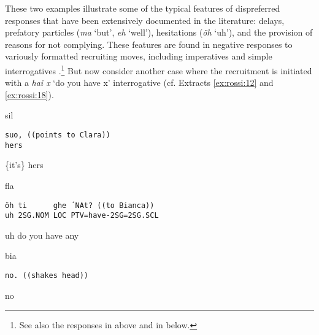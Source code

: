 \documentclass[output=paper,modfonts]{langscibook}
\begin{document}
These two examples illustrate some of the typical features of dispreferred responses that have been extensively documented in the literature: delays, prefatory particles (\textit{ma} ‘but’, \textit{eh} ‘well’), hesitations (\textit{öh} ‘uh’), and the provision of reasons for not complying. These features are found in negative responses to variously formatted recruiting moves, including imperatives  and simple interrogatives .\footnote{See also the responses in  above and in  below.} But now consider another case where the recruitment is initiated with a \textit{hai x} ‘do you have x’ interrogative (cf. Extracts \ref{ex:rossi:12} and \ref{ex:rossi:18}).

\vspace{2mm}
%
\begin{transbox}{1}{sil}
\begin{verbatim}
suo, ((points to Clara))
hers
\end{verbatim}
\{it's\} hers
\end{transbox}\vspace{1.5mm}
%
\vspace{-1mm}
%
\begin{mdframednoverticalspace}[style=firstfoc]
\begin{transbox}{3}{fla}
\begin{verbatim}
öh ti      ghe ´NAt? ((to Bianca))
uh 2SG.NOM LOC PTV=have-2SG=2SG.SCL
\end{verbatim}
uh do you have any
\end{transbox}
\end{mdframednoverticalspace}\vspace{-0.5mm}
%
\begin{mdframednoverticalspace}[style=secondfoc]
\begin{transbox}{4}{bia}
\begin{verbatim}
no. ((shakes head))
\end{verbatim}
no
\end{transbox}
\end{mdframednoverticalspace}\bigskip
\end{document}
